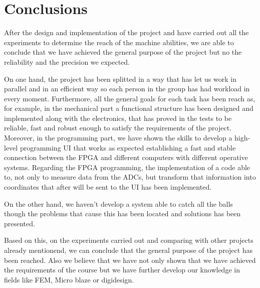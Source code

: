 \chapter{Conclusions}
\label{chap:conclusions}

	After the design and implementation of the project and have carried out all the experiments to determine the reach of the machine abilities, we are able to conclude that we have achieved the general purpose of the project but no the reliability and the precision we expected. 

On one hand, the project has been splitted in a way that has let us work in parallel and in an efficient way so each person in the group has had workload in every moment. Furthermore, all the general goals for each task has been reach as, for example, in the mechanical part a functional structure has been designed and implemented along with the electronics, that has proved in the tests to be reliable, fast and robust enough to satisfy the requirements of the project. Moreover, in the programming part, we have shown the skills to develop a high-level programming UI that works as expected establishing a fast and stable connection between the FPGA and different computers with different operative systems. Regarding the FPGA programming, the implementation of a code able to, not only to measure data from the ADCs, but transform that information into coordinates that after will be sent to the UI has been implemented.

On the other hand, we haven't develop a system able to catch all the balls though the problems that cause this has been located and solutions has been presented.

Based on this, on the experiments carried out and comparing with other projects already mentionend, we can conclude that the general purpose of the project has been reached. Also we believe that we have not only shown that we have  achieved the requirements of the course but we have further develop our knowledge in fields like FEM, Micro blaze or digidesign.